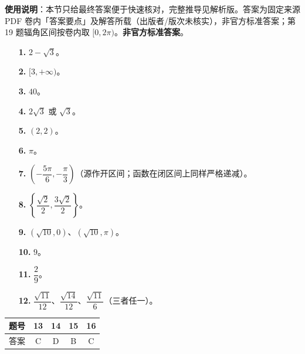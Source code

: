 
\begin{gknotice}
\textbf{使用说明}：本节只给最终答案便于快速核对，完整推导见解析版。答案为固定来源 PDF 卷内「答案要点」及解答所载（出版者/版次未核实），非官方标准答案；第 19 题辐角区间按卷内取 $[0,2\pi)$。\textbf{非官方标准答案}。
\end{gknotice}

\begin{itemize}[leftmargin=2.6em]
  \item[\textbf{1.}] $2-\sqrt3$。
  \item[\textbf{2.}] $[3,+\infty)$。
  \item[\textbf{3.}] $40$。
  \item[\textbf{4.}] $2\sqrt3$ 或 $\sqrt3$。
  \item[\textbf{5.}] $(2,2)$。
  \item[\textbf{6.}] $\pi$。
  \item[\textbf{7.}] $\left(-\dfrac{5\pi}6,-\dfrac{\pi}3\right)$（源作开区间；函数在闭区间上同样严格递减）。
  \item[\textbf{8.}] $\left\{\dfrac{\sqrt2}{2},\dfrac{3\sqrt2}{2}\right\}$。
  \item[\textbf{9.}] $(\sqrt{10},0)$、$(\sqrt{10},\pi)$。
  \item[\textbf{10.}] $9$。
  \item[\textbf{11.}] $\dfrac29$。
  \item[\textbf{12.}] $\dfrac{\sqrt{11}}{12}$、$\dfrac{\sqrt{14}}{12}$、$\dfrac{\sqrt{11}}6$（三者任一）。
\end{itemize}

\begin{center}\begin{tabular}{ccccc}
\toprule
题号 & 13 & 14 & 15 & 16 \\
\midrule
答案 & C & D & B & C \\
\bottomrule
\end{tabular}\end{center}

